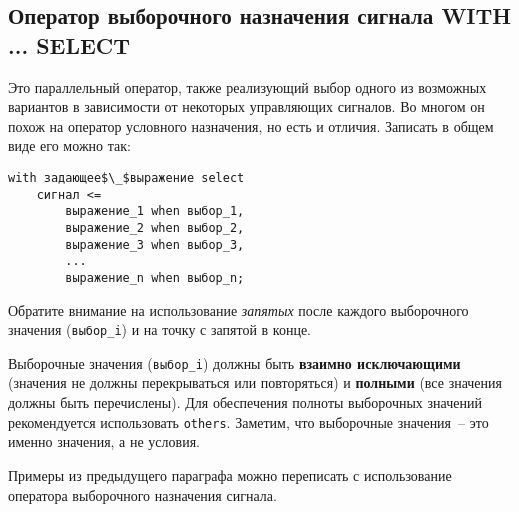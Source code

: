 \subsection{Оператор выборочного назначения сигнала WITH ... SELECT}

Это параллельный оператор, также реализующий выбор одного из возможных вариантов в зависимости от некоторых управляющих сигналов. Во многом он похож на оператор условного назначения, но есть и отличия. Записать в общем виде его можно так:
\begin{Code}
\begin{lstlisting}[mathescape]
with задающее$\_$выражение select
    сигнал <=
        выражение_1 when выбор_1,
        выражение_2 when выбор_2,
        выражение_3 when выбор_3,
        ...
        выражение_n when выбор_n;
\end{lstlisting}
\end{Code}

Обратите внимание на использование \emph{запятых} после каждого выборочного значения (\lstinline?выбор_i?) и на точку с запятой в конце.

Выборочные значения (\lstinline?выбор_i?) должны быть \textbf{взаимно исключающими} (значения не должны перекрываться или повторяться) и \textbf{полными} (все значения должны быть перечислены). Для обеспечения полноты выборочных значений рекомендуется использовать \lstinline?others?. Заметим, что выборочные значения~-- это именно значения, а не условия.

Примеры из предыдущего параграфа можно переписать с использование оператора выборочного назначения сигнала. 
